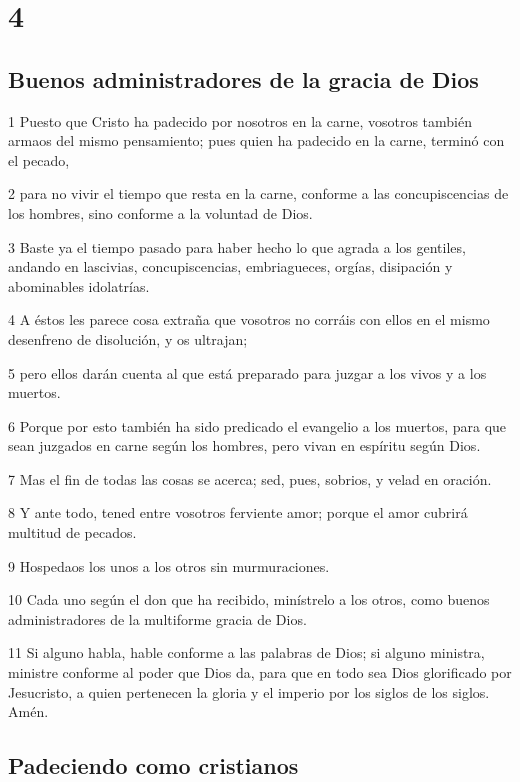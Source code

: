 \chapter{4}

\section*{Buenos administradores de la gracia de Dios}

\par 1 Puesto que Cristo ha padecido por nosotros en la carne, vosotros también armaos del mismo pensamiento; pues quien ha padecido en la carne, terminó con el pecado,
\par 2 para no vivir el tiempo que resta en la carne, conforme a las concupiscencias de los hombres, sino conforme a la voluntad de Dios.
\par 3 Baste ya el tiempo pasado para haber hecho lo que agrada a los gentiles, andando en lascivias, concupiscencias, embriagueces, orgías, disipación y abominables idolatrías.
\par 4 A éstos les parece cosa extraña que vosotros no corráis con ellos en el mismo desenfreno de disolución, y os ultrajan;
\par 5 pero ellos darán cuenta al que está preparado para juzgar a los vivos y a los muertos.
\par 6 Porque por esto también ha sido predicado el evangelio a los muertos, para que sean juzgados en carne según los hombres, pero vivan en espíritu según Dios.
\par 7 Mas el fin de todas las cosas se acerca; sed, pues, sobrios, y velad en oración.
\par 8 Y ante todo, tened entre vosotros ferviente amor; porque el amor cubrirá multitud de pecados.
\par 9 Hospedaos los unos a los otros sin murmuraciones.
\par 10 Cada uno según el don que ha recibido, minístrelo a los otros, como buenos administradores de la multiforme gracia de Dios.
\par 11 Si alguno habla, hable conforme a las palabras de Dios; si alguno ministra, ministre conforme al poder que Dios da, para que en todo sea Dios glorificado por Jesucristo, a quien pertenecen la gloria y el imperio por los siglos de los siglos. Amén.

\section*{Padeciendo como cristianos}

